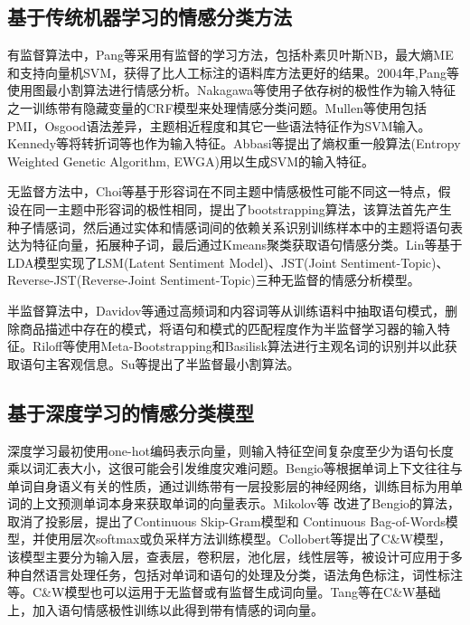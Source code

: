 \subsection{基于传统机器学习的情感分类方法}
有监督算法中，Pang等\cite{bopang2002}采用有监督的学习方法，包括朴素贝叶斯NB，最大熵ME和支持向量机SVM，获得了比人工标注的语料库方法更好的结果。2004年,Pang等\cite{Pang2004}使用图最小割算法进行情感分析。Nakagawa等\cite{Nakagawa2010}使用子依存树的极性作为输入特征之一训练带有隐藏变量的CRF模型来处理情感分类问题。Mullen等\cite{Mullen2004}使用包括PMI，Osgood语法差异\cite{Osgood1957}，主题相近程度和其它一些语法特征作为SVM输入。Kennedy等\cite{Kennedy2006}将转折词等也作为输入特征。Abbasi等\cite{Abbasi2008}提出了熵权重一般算法(Entropy Weighted Genetic Algorithm, EWGA)用以生成SVM的输入特征。

无监督方法中，Choi等\cite{Do2015}基于形容词在不同主题中情感极性可能不同这一特点，假设在同一主题中形容词的极性相同，提出了bootstrapping算法，该算法首先产生种子情感词，然后通过实体和情感词间的依赖关系识别训练样本中的主题将语句表达为特征向量，拓展种子词，最后通过Kmeans聚类获取语句情感分类。Lin等\cite{Lin2010}基于LDA模型实现了LSM(Latent Sentiment Model)、JST(Joint Sentiment-Topic)、Reverse-JST(Reverse-Joint Sentiment-Topic)三种无监督的情感分析模型。

半监督算法中，Davidov等\cite{Davidov2010}通过高频词和内容词等从训练语料中抽取语句模式，删除商品描述中存在的模式，将语句和模式的匹配程度作为半监督学习器的输入特征。Riloff等\cite{Riloff2003}使用Meta-Bootstrapping和Basilisk算法进行主观名词的识别并以此获取语句主客观信息。Su等\cite{Su2009}提出了半监督最小割算法。
\subsection{基于深度学习的情感分类模型}
深度学习最初使用one-hot编码表示向量，则输入特征空间复杂度至少为语句长度乘以词汇表大小，这很可能会引发维度灾难问题。Bengio等\cite{Bengio2003}根据单词上下文往往与单词自身语义有关的性质，通过训练带有一层投影层的神经网络，训练目标为用单词的上文预测单词本身来获取单词的向量表示。Mikolov等\cite{mikolov2013} \cite{mikolov2013b}改进了Bengio的算法，取消了投影层，提出了Continuous Skip-Gram模型和 Continuous Bag-of-Words模型，并使用层次softmax或负采样方法训练模型。Collobert等\cite{collobert2011}提出了C\&W模型，该模型主要分为输入层，查表层，卷积层，池化层，线性层等，被设计可应用于多种自然语言处理任务，包括对单词和语句的处理及分类，语法角色标注，词性标注等。C\&W模型也可以运用于无监督或有监督生成词向量。Tang等\cite{Tang2014c}在C\&W基础上，加入语句情感极性训练以此得到带有情感的词向量。

